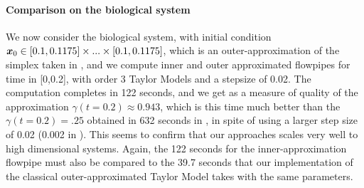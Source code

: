 




\paragraph{Comparison on the biological system}
We now consider the biological system, with initial condition $\x_0 \in [0.1,0.1175] \times...\times [0.1,0.1175]$, which is an outer-approximation
of the simplex taken in  \cite{Underapproxflowpipes}, and we compute inner and outer approximated flowpipes for time in [0,0.2], 
with order 3 Taylor Models and a stepsize of 0.02. The computation completes in 122 seconds, and we get as a measure of quality of the approximation 
$\gamma(t=0.2) \approx 0.943$, which is this time much better than the $\gamma(t=0.2) = .25$ obtained in 632 seconds in  \cite{Underapproxflowpipes}, in spite of using a larger step size of 0.02 (0.002 in \cite{Underapproxflowpipes}). This seems to confirm that our approaches scales very well to high dimensional systems. 
Again, the 122 seconds for the inner-approximation flowpipe must also be compared to the 39.7 seconds that our implementation of the classical 
outer-approximated Taylor Model takes with the same parameters.


